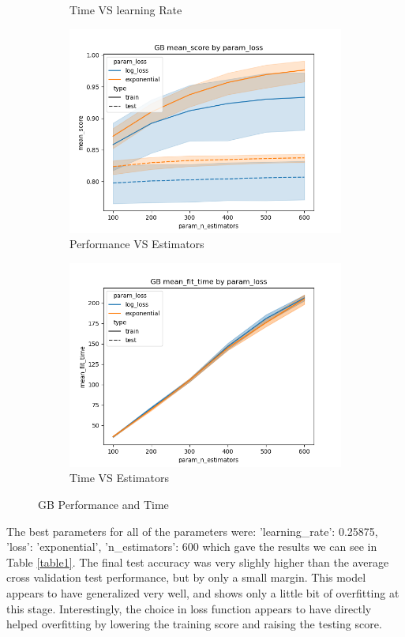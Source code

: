 \documentclass[12pt]{article}
\begin{document}
\begin{figure}
\begin{subfigure}{.5\textwidth}
    \caption{Time VS learning Rate}
  \end{subfigure}
  \begin{subfigure}{.5\textwidth}
    \includegraphics[width=.95\textwidth]{../results/gb/param_loss_mean_score_param_n_estimators.png}
    \caption{Performance VS Estimators}
  \end{subfigure}%
  \begin{subfigure}{.5\textwidth}
    \includegraphics[width=.95\textwidth]{../results/gb/param_loss_mean_fit_time_param_n_estimators.png}
    \caption{Time VS Estimators}
  \end{subfigure}
  \caption{GB Performance and Time}
  \label{figure1}
\end{figure}

The best parameters for all of the parameters were: {'learning\_rate': 0.25875, 'loss': 'exponential', 'n\_estimators': 600} 
which gave the results we can see in Table \ref{table1}. The final test accuracy was very slighly higher than the average
cross validation test performance, but by only a small margin. This model appears to have generalized very well, and shows
only a little bit of overfitting at this stage. Interestingly, the choice in loss function appears to have directly helped
overfitting by lowering the training score and raising the testing score.
\end{document}

